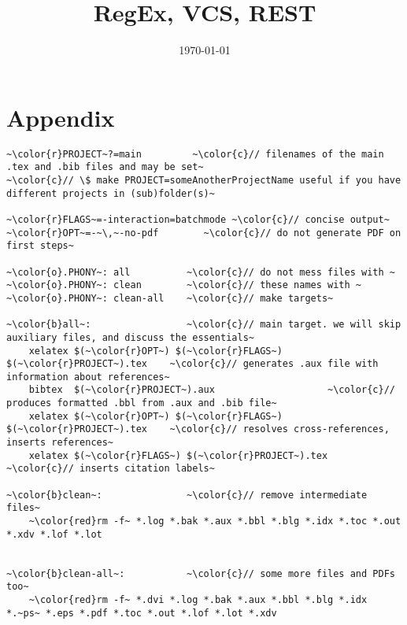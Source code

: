 \documentclass{cls/lab}
\begin{document}
\title{RegEx, VCS, REST}
\date{\today}

\def \link{https://github.com/feeltheajf/ES-4}
  
\maketitle\thispagestyle{empty}


\newpage

% 












%

\newpage
\section*{Appendix}\vspace{3em}

\begin{lstlisting}[caption={Makefile},label=listing1,captionpos=b]
~\color{r}PROJECT~?=main         ~\color{c}// filenames of the main .tex and .bib files and may be set~
~\color{c}// \$ make PROJECT=someAnotherProjectName useful if you have different projects in (sub)folder(s)~

~\color{r}FLAGS~=-interaction=batchmode ~\color{c}// concise output~
~\color{r}OPT~=-~\,~-no-pdf        ~\color{c}// do not generate PDF on first steps~

~\color{o}.PHONY~: all          ~\color{c}// do not mess files with ~
~\color{o}.PHONY~: clean        ~\color{c}// these names with ~
~\color{o}.PHONY~: clean-all    ~\color{c}// make targets~

~\color{b}all~:                 ~\color{c}// main target. we will skip auxiliary files, and discuss the essentials~
	xelatex $(~\color{r}OPT~) $(~\color{r}FLAGS~) $(~\color{r}PROJECT~).tex    ~\color{c}// generates .aux file with information about references~
	bibtex  $(~\color{r}PROJECT~).aux                    ~\color{c}// produces formatted .bbl from .aux and .bib file~
	xelatex $(~\color{r}OPT~) $(~\color{r}FLAGS~) $(~\color{r}PROJECT~).tex    ~\color{c}// resolves cross-references, inserts references~
	xelatex $(~\color{r}FLAGS~) $(~\color{r}PROJECT~).tex           ~\color{c}// inserts citation labels~

~\color{b}clean~:               ~\color{c}// remove intermediate files~
	~\color{red}rm -f~ *.log *.bak *.aux *.bbl *.blg *.idx *.toc *.out *.xdv *.lof *.lot               


~\color{b}clean-all~:           ~\color{c}// some more files and PDFs too~
	~\color{red}rm -f~ *.dvi *.log *.bak *.aux *.bbl *.blg *.idx *.~ps~ *.eps *.pdf *.toc *.out *.lof *.lot *.xdv
\end{lstlisting}

\newpage
\vspace{6em}
\listoffigures

\vspace{6em}
\listoftables

\vspace{6em}


\end{document}
